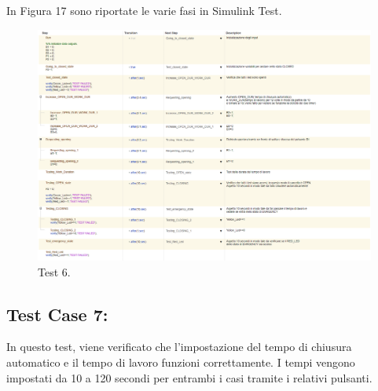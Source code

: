\documentclass[12pt]{article}
\begin{document}
In Figura 17 sono riportate le varie fasi in Simulink Test.
\begin{figure}[H]
    
    \hspace{-2.3cm} %
    \includegraphics[width=1.3\textwidth]{Immagini_Test/Test_6_img.PNG}
    \caption{Test 6.}
    \label{fig:Test_6}
\end{figure}
\newpage
\subsection{Test Case 7: }
In questo test, viene verificato che l'impostazione del tempo di chiusura automatico e il tempo di lavoro funzioni correttamente. I tempi vengono impostati da 10 a 120 secondi per entrambi i casi tramite i relativi pulsanti.
\end{document}
